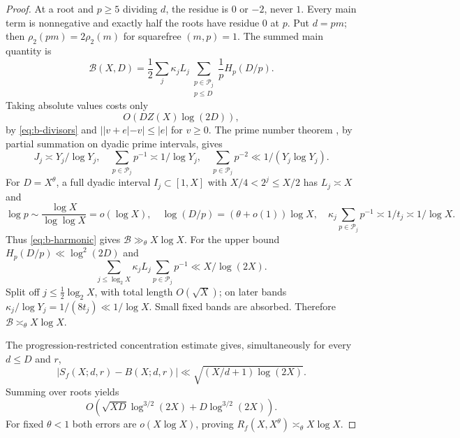 \documentclass[11pt]{article}
\theoremstyle{definition}
\theoremstyle{remark}
\numberwithin{equation}{section}
\begin{document}
\begin{proof}
At a root and $p\ge5$ dividing $d$, the residue is $0$ or $-2$, never $1$. Every main term is
nonnegative and exactly half the roots have residue $0$ at $p$. Put $d=pm$; then
$\rho_2(pm)=2\rho_2(m)$ for squarefree $(m,p)=1$. The summed main quantity is
\begin{equation}\label{eq:b-root-main}
 \mathcal B(X,D)=\frac12\sum_j\kappa_jL_j
 \sum_{\substack{p\in\mathcal P_j\\p\le D}}\frac1pH_p(D/p).
\end{equation}
Taking absolute values costs only
\begin{equation}\label{eq:b-root-deterministic-error}
 O(DZ(X)\log(2D)),
\end{equation}
by \eqref{eq:b-divisors} and $||v+e|-v|\le|e|$ for $v\ge0$.
The prime number theorem \cite{MV}, by partial summation on dyadic prime intervals, gives
\begin{equation}\label{eq:b-prime-counts}
 J_j\asymp Y_j/\log Y_j,\quad
 \sum_{p\in\mathcal P_j}p^{-1}\asymp1/\log Y_j,\quad
 \sum_{p\in\mathcal P_j}p^{-2}\ll1/(Y_j\log Y_j).
\end{equation}
For $D=X^\theta$, a full dyadic interval $I_j\subset[1,X]$ with $X/4<2^j\le X/2$ has $L_j\asymp X$ and
\begin{equation}\label{eq:b-full-band}
 \log p\sim\frac{\log X}{\log\log X}=o(\log X),\quad
 \log(D/p)=(\theta+o(1))\log X,\quad
 \kappa_j\sum_{p\in\mathcal P_j}p^{-1}\asymp1/t_j\asymp1/\log X.
\end{equation}
Thus \eqref{eq:b-harmonic} gives $\mathcal B\gg_\theta X\log X$.
For the upper bound $H_p(D/p)\ll\log^2(2D)$ and
\begin{equation}\label{eq:b-main-upper}
 \sum_{j\le\log_2X}\kappa_jL_j\sum_{p\in\mathcal P_j}p^{-1}\ll X/\log(2X).
\end{equation}
Split off $j\le\frac12\log_2X$, with total length $O(\sqrt X)$; on later bands
$\kappa_j/\log Y_j=1/(8t_j)\ll1/\log X$. Small fixed bands are absorbed. Therefore
$\mathcal B\asymp_\theta X\log X$.

The progression-restricted concentration estimate gives, simultaneously for every $d\le D$ and $r$,
\begin{equation}\label{eq:b-progression-deviation}
 |S_f(X;d,r)-B(X;d,r)|\ll\sqrt{(X/d+1)\log(2X)}.
\end{equation}
Summing over roots yields
\begin{equation}\label{eq:b-root-random-error}
 O\left(\sqrt{XD}\log^{3/2}(2X)+D\log^{3/2}(2X)\right).
\end{equation}
For fixed $\theta<1$ both errors are $o(X\log X)$, proving $R_f(X,X^\theta)\asymp_\theta X\log X$.


\end{proof}
\end{document}
